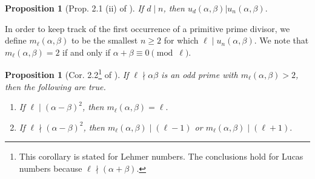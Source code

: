 \documentclass[12pt]{amsart}
\newtheorem{prop}[thm]{Proposition}
\numberwithin{equation}{section}
\begin{document}
\begin{prop}[Prop. 2.1 (ii) of \cite{BHV}]\label{PropA}  If $d\mid n$, then $u_d(\alpha, \beta) | u_n(\alpha,\beta).$
\end{prop}

In order to keep track of the first occurrence of a primitive prime divisor, we define $m_{\ell}(\alpha,\beta)$ to be the smallest $n\geq 2$ for which $\ell \mid u_n(\alpha,\beta)$. We note that $m_{\ell}(\alpha,\beta)=2$ if and only if
$\alpha +\beta\equiv 0\pmod {\ell}.$
\begin{prop}[Cor. 2.2\footnote{This corollary is stated for Lehmer numbers. The conclusions hold for Lucas numbers because $\ell \nmid (\alpha+\beta)$.} of \cite{BHV}]\label{PropB} If $\ell\nmid \alpha \beta$ is an odd prime with
$m_{\ell}(\alpha,\beta)>2$, then the following are true.
\begin{enumerate}
\item If $\ell \mid (\alpha-\beta)^2$, then $m_{\ell}(\alpha,\beta)=\ell.$
\item If $\ell \nmid (\alpha-\beta)^2$, then $m_{\ell}(\alpha,\beta) \mid (\ell-1)$ or $m_{\ell}(\alpha,\beta)\mid (\ell+1).$
\end{enumerate}
\end{prop}
\end{document}
